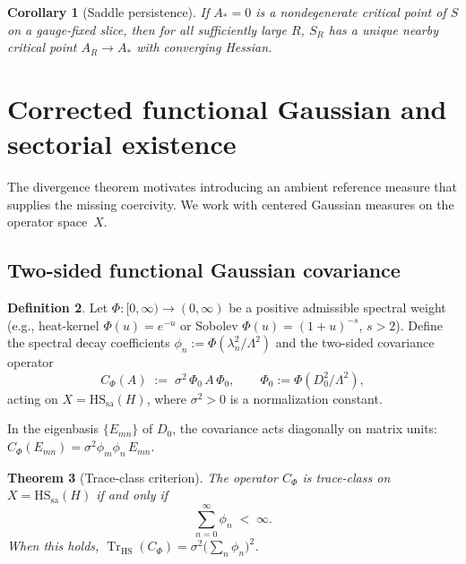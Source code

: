 \documentclass[12pt,a4paper]{article}
\theoremstyle{plain}
\newtheorem{theorem}{Theorem}[section]
\newtheorem{corollary}[theorem]{Corollary}
\theoremstyle{definition}
\newtheorem{definition}[theorem]{Definition}
\theoremstyle{remark}
\newcommand{\Tr}{\operatorname{Tr}}
\newcommand{\HS}{\mathrm{HS}}
\newcommand{\sa}{\mathrm{sa}}
\newcommand{\Lam}{\Lambda}
\begin{document}
\begin{corollary}[Saddle persistence]
\label{cor:saddle-persistence}
If $A_* = 0$ is a nondegenerate critical point of $S$ on a gauge-fixed
slice, then for all sufficiently large $R$, $S_R$ has a unique nearby
critical point $A_R \to A_*$ with converging Hessian.
\end{corollary}

\section{Corrected functional Gaussian and sectorial existence}
\label{sec:gaussian}

The divergence theorem motivates introducing an ambient reference
measure that supplies the missing coercivity.  We work with centered
Gaussian measures on the operator space~$X$.

\subsection{Two-sided functional Gaussian covariance}

\begin{definition}\label{def:covariance}
Let $\Phi\colon [0,\infty) \to (0,\infty)$ be a positive admissible
spectral weight (e.g., heat-kernel $\Phi(u) = e^{-u}$ or Sobolev
$\Phi(u) = (1+u)^{-s}$, $s > 2$).  Define the spectral decay
coefficients $\phi_n := \Phi(\lambda_n^2/\Lam^2)$ and the two-sided
covariance operator
\begin{equation}\label{eq:covariance}
  C_\Phi(A) \;:=\; \sigma^2\, \Phi_0\, A\, \Phi_0,
  \qquad \Phi_0 := \Phi(D_0^2/\Lam^2),
\end{equation}
acting on $X = \HS_\sa(H)$, where $\sigma^2 > 0$ is a
normalization constant.
\end{definition}

In the eigenbasis $\{E_{mn}\}$ of $D_0$, the covariance acts
diagonally on matrix units:
$C_\Phi(E_{mn}) = \sigma^2 \phi_m \phi_n\, E_{mn}$.

\begin{theorem}[Trace-class criterion]
\label{thm:trace-class}
The operator $C_\Phi$ is trace-class on $X = \HS_\sa(H)$ if and only if
\begin{equation}\label{eq:trace-class-condition}
  \sum_{n=0}^\infty \phi_n \;<\; \infty.
\end{equation}
When this holds, $\Tr_{\HS}(C_\Phi) = \sigma^2\bigl(\sum_n
\phi_n\bigr)^2$.
\end{theorem}
\end{document}
